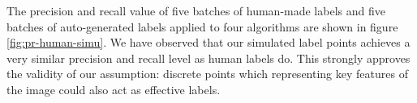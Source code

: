 \documentclass[runningheads,a4paper]{llncs}
\begin{document}
The precision and recall value of five batches of human-made labels and five batches of auto-generated labels applied to four algorithms are shown in figure \ref{fig:pr-human-simu}. We have observed that our simulated label points achieves a very similar precision and recall level as human labels do. This strongly approves the validity of our assumption: discrete points which representing key features of the image could also act as effective labels.


\begin{figure}[!tb]
\centering
{}


\end{figure}
\end{document}
